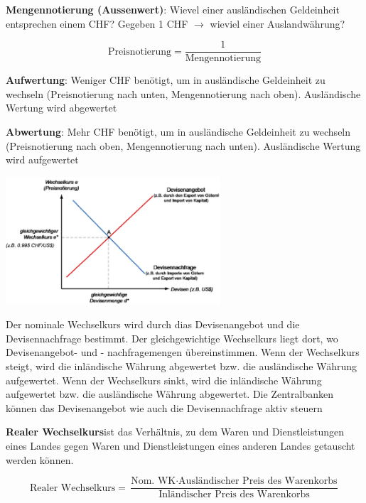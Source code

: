 \documentclass[9pt, landscape, fleqn]{scrartcl}
\begin{document}
\begin{multicols*}{3}
\textbf{Mengennotierung (Aussenwert)}: Wievel einer ausländischen Geldeinheit entsprechen einem CHF? Gegeben 1 CHF $\rightarrow$ wieviel einer Auslandwährung?

\begin{equation}
    \text{Preisnotierung} = \frac{1}{\text{Mengennotierung}}
\end{equation}

\textbf{Aufwertung}: Weniger CHF benötigt, um in ausländische Geldeinheit zu wechseln (Preisnotierung nach unten, Mengennotierung nach oben). Ausländische Wertung wird abgewertet \newline

\textbf{Abwertung}: Mehr CHF benötigt, um in ausländische Geldeinheit zu wechseln (Preisnotierung nach oben, Mengennotierung nach unten). Ausländische Wertung wird aufgewertet \newline 

\begin{center}
    \includegraphics[width=8cm]{Bestimmung_nomineller_Wechselkurs.png}
\end{center}

Der nominale Wechselkurs wird durch dias Devisenangebot und die Devisennachfrage bestimmt. Der gleichgewichtige Wechselkurs liegt dort, wo Devisenangebot- und - nachfragemengen übereinstimmen. Wenn der Wechselkurs steigt, wird die inländische Währung abgewertet bzw. die ausländische Währung aufgewertet. Wenn der Wechselkurs sinkt, wird die inländische Währung aufgewertet bzw. die ausländische Währung abgewertet. Die Zentralbanken können das Devisenangebot wie auch die Devisennachfrage aktiv steuern\newline 

\textbf{Realer Wechselkurs}ist das Verhältnis, zu dem Waren und Dienstleistungen eines Landes gegen Waren und Dienstleistungen eines anderen Landes getauscht werden können.

\begin{equation}
    \text{Realer Wechselkurs} = \frac{\text{Nom. WK}\cdot \text{Ausländischer Preis des Warenkorbs}}{\text{Inländischer Preis des Warenkorbs}}
\end{equation}


\end{multicols*}
\end{document}
